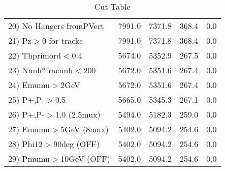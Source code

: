 \begin{table}[h!]
\begin{tabular}{||l||r|r|r|r||}
 20) No Hangers fromPVert &      7991.0 &      7371.8 &       368.4 &         0.0 \\
 21) Pz$>$0 for tracks    &      7991.0 &      7371.8 &       368.4 &         0.0 \\
 22) Thprimord$<$0.4      &      5674.0 &      5352.9 &       267.5 &         0.0 \\
 23) Nunh*fracunh$<$200   &      5672.0 &      5351.6 &       267.4 &         0.0 \\
 24) Emumu$>$2GeV         &      5672.0 &      5351.6 &       267.4 &         0.0 \\
 25) P+,P-$>$0.5          &      5665.0 &      5345.3 &       267.1 &         0.0 \\
 26) P+,P-$>$1.0 (2.5mux) &      5494.0 &      5182.3 &       259.0 &         0.0 \\
 27) Emumu$>$5GeV  (8mux) &      5402.0 &      5094.2 &       254.6 &         0.0 \\
 28) Phi12$>$90deg  (OFF) &      5402.0 &      5094.2 &       254.6 &         0.0 \\
 29) Pmumu$>$10GeV  (OFF) &      5402.0 &      5094.2 &       254.6 &         0.0 \\
 \hline
 \hline
 \end{tabular}
 \caption{Cut Table \cohrp  }
 \label{tab-cut_crhop}
 \end{table}
